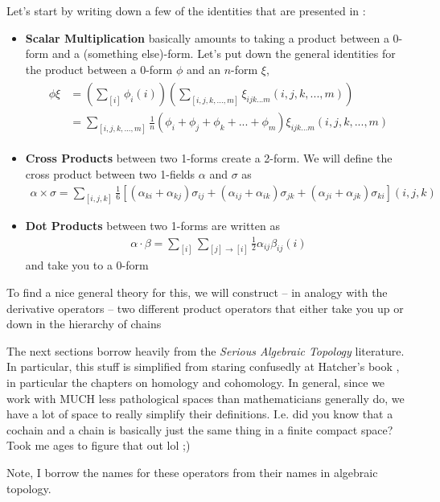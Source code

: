 \documentclass[11pt, oneside]{article} %
\numberwithin{equation}{section}
\begin{document}
Let's start by writing down a few of the identities that are presented in \cite{schwalm_vector_1999}:
\begin{itemize}
    \item \textbf {Scalar Multiplication} 
     basically amounts to taking a product between a 0-form and a (something else)-form. Let's put down the general identities for the product between a 0-form $\phi$ and an $n$-form $\xi$,
    \begin{align}\begin{aligned}
        \phi \xi &= 
        \left (
        \sum_{[i] } \phi_i (i)
        \right )
        \left (
        \sum_{[i,j,k,...,m] }\xi_{ijk...m} (i,j,k,...,m)
        \right ) \\
        &=\sum_{[i,j,k,...,m]}
        \frac 1n (\phi_i + \phi_j + \phi_k + ... + \phi_m)
        \xi_{ijk...m} (i,j,k,...,m)
    \end{aligned}
    \end{align}

    \item \textbf {Cross Products} 
     between two 1-forms create a 2-form. We will define the cross product between two 1-fields $\alpha$ and $\sigma$ as 
    \begin{align}
        \alpha \times \sigma = 
        \sum_{[i,j,k]} \frac 16 \left [ 
        (\alpha_{ki} +\alpha_{kj} )\sigma_{ij}
        + (\alpha_{ij} +\alpha_{ik} )\sigma_{jk}
        + (\alpha_{ji} +\alpha_{jk} )\sigma_{ki}
        \right ](i,j,k)
    \end{align}

    \item \textbf {Dot Products} between two 1-forms are written as 
    \begin{align}
        \alpha \cdot \beta = \sum_{[i]} 
        \sum_{[j]\rightarrow [i]} 
        \frac 12 \alpha_{ij}\beta_{ij} (i)
    \end{align}
    and take you to a 0-form
\end{itemize}
To find a nice general theory for this, we will construct -- in analogy with the derivative operators -- two different product operators that either take you up or down in the hierarchy of chains

\begin{shaded}
    The next sections borrow heavily from the \textit{Serious Algebraic Topology} literature. In particular, this stuff is simplified from staring confusedly at Hatcher's book \cite{hatcher_algebraic_2002}, in particular the chapters on homology and cohomology. In general, since we work with MUCH less pathological spaces than mathematicians generally do, we have a lot of space to really simplify their definitions. I.e. did you know that a cochain and a chain is basically just the same thing in a finite compact space? Took me ages to figure that out lol ;) 
    
    Note, I borrow the names for these operators from their names in algebraic topology. 
\end{shaded}
\end{document}
